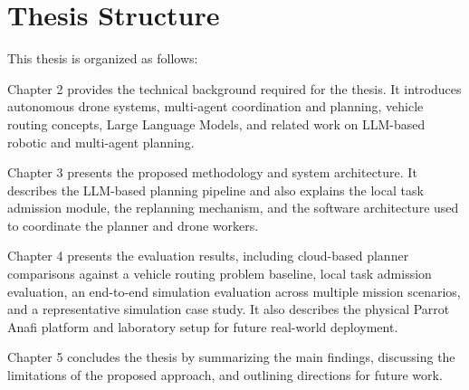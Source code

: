 \section{Thesis Structure}

This thesis is organized as follows:

Chapter 2 provides the technical background required for the thesis. It introduces autonomous
drone systems, multi-agent coordination and planning, vehicle routing concepts, Large Language
Models, and related work on LLM-based robotic and multi-agent planning.

Chapter 3 presents the proposed methodology and system architecture. It describes the
LLM-based planning pipeline and also explains the local task admission module, the replanning mechanism, and the software
architecture used to coordinate the planner and drone workers.

Chapter 4 presents the evaluation results, including cloud-based planner comparisons against a vehicle routing problem baseline, 
local task admission evaluation,  an end-to-end simulation evaluation across multiple mission scenarios, and a representative simulation case study.
It also describes the physical Parrot Anafi platform and laboratory setup for future real-world deployment.

Chapter 5 concludes the thesis by summarizing the main findings, discussing the limitations
of the proposed approach, and outlining directions for future work.